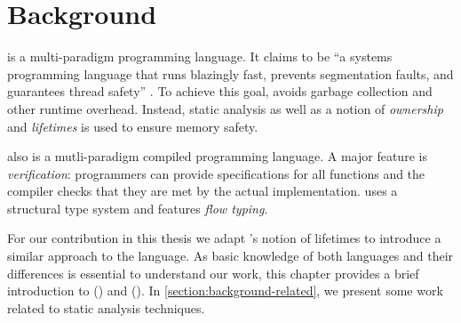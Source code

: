\chapter{Background}\label{chapter:background}
\rust is a multi-paradigm programming language.
It claims to be \enquote{a systems programming language that runs blazingly fast, prevents segmentation faults, and guarantees thread safety} \cite{RustHomepage}.
To achieve this goal, \rust avoids garbage collection and other runtime overhead.
Instead, static analysis as well as a notion of \emph{ownership} and \emph{lifetimes} is used to ensure memory safety.

\whiley also is a mutli-paradigm compiled programming language.
A major feature is \emph{verification}: programmers can provide specifications for all functions and the compiler checks that they are met by the actual implementation.
\whiley uses a structural type system and features \emph{flow typing}.

For our contribution in this thesis we adapt \rust's notion of lifetimes to introduce a similar approach to the \whiley language.
As basic knowledge of both languages and their differences is essential to understand our work, this chapter provides a brief introduction to \rust () and \whiley ().
In \ref{section:background-related}, we present some work related to static analysis techniques.